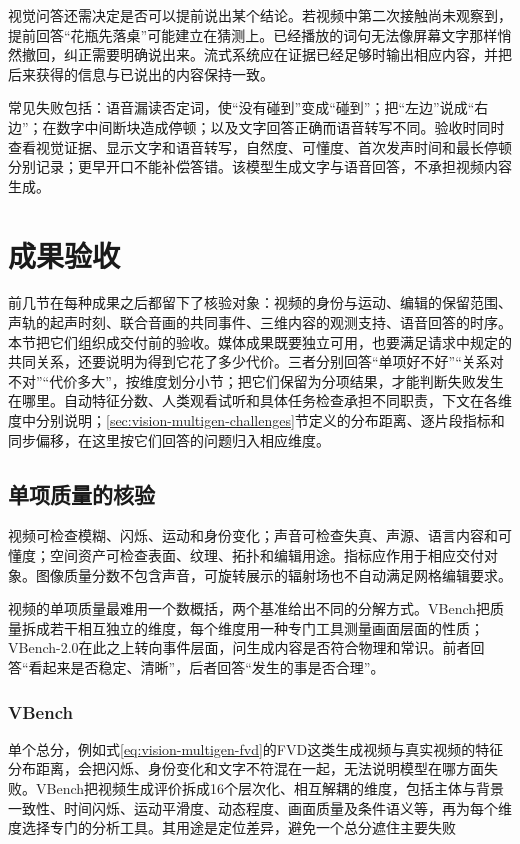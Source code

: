 视觉问答还需决定是否可以提前说出某个结论。若视频中第二次接触尚未观察到，提前回答“花瓶先落桌”可能建立在猜测上。已经播放的词句无法像屏幕文字那样悄然撤回，纠正需要明确说出来。流式系统应在证据已经足够时输出相应内容，并把后来获得的信息与已说出的内容保持一致。

常见失败包括：语音漏读否定词，使“没有碰到”变成“碰到”；把“左边”说成“右边”；在数字中间断块造成停顿；以及文字回答正确而语音转写不同。验收时同时查看视觉证据、显示文字和语音转写，自然度、可懂度、首次发声时间和最长停顿分别记录；更早开口不能补偿答错。该模型生成文字与语音回答，不承担视频内容生成。

\section{成果验收}
\label{sec:vision-multigen-evaluation}

前几节在每种成果之后都留下了核验对象：视频的身份与运动、编辑的保留范围、声轨的起声时刻、联合音画的共同事件、三维内容的观测支持、语音回答的时序。本节把它们组织成交付前的验收。媒体成果既要独立可用，也要满足请求中规定的共同关系，还要说明为得到它花了多少代价。三者分别回答“单项好不好”“关系对不对”“代价多大”，按维度划分小节；把它们保留为分项结果，才能判断失败发生在哪里。自动特征分数、人类观看试听和具体任务检查承担不同职责，下文在各维度中分别说明；\ref{sec:vision-multigen-challenges}节定义的分布距离、逐片段指标和同步偏移，在这里按它们回答的问题归入相应维度。

\subsection{单项质量的核验}
\label{sec:vision-multigen-quality}

视频可检查模糊、闪烁、运动和身份变化；声音可检查失真、声源、语言内容和可懂度；空间资产可检查表面、纹理、拓扑和编辑用途。指标应作用于相应交付对象。图像质量分数不包含声音，可旋转展示的辐射场也不自动满足网格编辑要求。

视频的单项质量最难用一个数概括，两个基准给出不同的分解方式。VBench把质量拆成若干相互独立的维度，每个维度用一种专门工具测量画面层面的性质；VBench-2.0在此之上转向事件层面，问生成内容是否符合物理和常识。前者回答“看起来是否稳定、清晰”，后者回答“发生的事是否合理”。

\subsubsection{VBench}
\label{sec:vision-multigen-vbench}

单个总分，例如式\eqref{eq:vision-multigen-fvd}的FVD这类生成视频与真实视频的特征分布距离，会把闪烁、身份变化和文字不符混在一起，无法说明模型在哪方面失败。VBench把视频生成评价拆成16个层次化、相互解耦的维度，包括主体与背景一致性、时间闪烁、运动平滑度、动态程度、画面质量及条件语义等，再为每个维度选择专门的分析工具。其用途是定位差异，避免一个总分遮住主要失败

